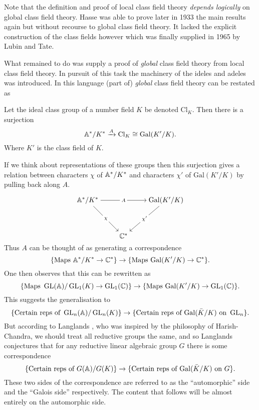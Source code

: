 Note that the definition and proof of local class field theory \textit{depends logically } on global class field theory. Hasse was able to prove later in 1933 the main results again but without recourse to global class field theory. It lacked the explicit construction of the class fields however which was finally supplied in 1965 by Lubin and Tate.

What remained to do was supply a proof of \textit{global} class field theory from local class field theory. In pursuit of this task the machinery of the ideles and adeles was introduced. In this language (part of) \textit{global} class field theory can be restated as 
\begin{Theorem}
	Let the ideal class group of a number field \(K\) be denoted \(\mathrm{Cl}_K\). Then there is a surjection
	\[ \A^*/ K^* \xrightarrow{A} \mathrm{Cl}_K \cong \mathrm{Gal}(K'/K).\]
	Where \(K'\) is the class field of \(K\).
\end{Theorem}
If we think about representations of these groups then this surjection gives a relation between characters \(\chi\) of \(\A^*/K^*\) and characters \(\chi'\) of \(\mathrm{Gal}(K'/K)\) by pulling back along \(A\).

\[\begin{tikzcd}[cramped]
	{\A^*/K^*} && {\mathrm{Gal}(K'/K)} \\
	\\
	& {\C^*}
	\arrow["A"{description}, from=1-1, to=1-3]
	\arrow["\chi"{description}, from=1-1, to=3-2]
	\arrow["{\chi'}"{description}, from=1-3, to=3-2]
\end{tikzcd}\]
Thus \(A\) can be thought of as generating a correspondence
\[\{\text{Maps }\A^*/K^*\to \C^*\} \to\{ \text{Maps }\mathrm{Gal}(K'/K)\to \C^*\}. \]
One then observes that this can be rewritten as 
\[\{\text{Maps }\GL(\A)/\GL_1(K)\to \GL_1(\C)\} \to\{ \text{Maps }\mathrm{Gal}(K'/K)\to \GL_1(\C)\} .\]
This suggests the generalisation to 
\[\{\text{Certain reps of }\GL_n(\A)/\GL_n(K)\} \to\{ \text{Certain reps of  }\mathrm{Gal}(\bar{K}/K)\text{ on } \GL_n\}   .\]
But according to Langlands \cite{langlandsRepresentationTheoryIts1989}, who was inspired by the philosophy of Harish-Chandra, we should treat all reductive groups the same, and so Langlands conjectures that for any reductive linear algebraic group \(G\) there is some correspondence
\[\{\text{Certain reps of }G(\A)/G(K)\} \to\{ \text{Certain reps of  }\mathrm{Gal}(\bar{K}/K)\text{ on } G\} .\]
These two sides of the correspondence are referred to as the ``automorphic'' side and the ``Galois side'' respectively. The content that follows will be almost entirely on the automorphic side. 


